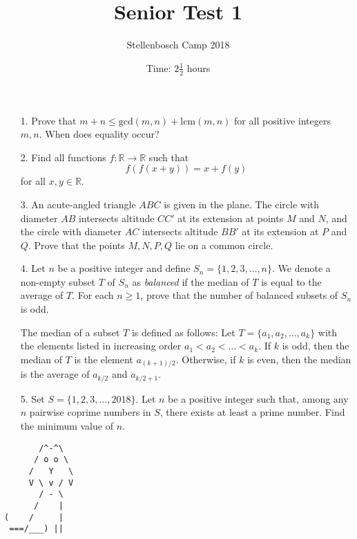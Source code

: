 \documentclass[a4paper, 12pt]{article}
\title{Senior Test 1}
\author{Stellenbosch Camp 2018}
\date{Time: $2 \frac{1}{2}$ hours}
\begin{document}
 \maketitle

\begin{enumerate}


\item[1.] Prove that $m + n \leq \textrm{gcd}(m, n) + \textrm{lcm}(m, n)$ for all positive integers $m, n$. When does equality occur?

\item[2.] Find all functions $f : \mathbb{R} \to \mathbb{R}$ such that
$$ f(f(x+y)) = x + f(y) $$
for all $x, y \in \mathbb{R}$.

\item[3.] An acute-angled triangle $ABC$ is given in the plane. The circle with diameter $AB$ intersects altitude $CC'$ at its extension at points $M$ and $N$, and the circle with diameter $AC$ intersects altitude $BB'$ at its extension at $P$ and $Q$. Prove that the points $M, N, P, Q$ lie on a common circle.


\item[4.] Let $n$ be a positive integer and define $S_n = \{1, 2, 3, \dots, n\}$. We denote a non-empty subset $T$ of $S_n$ as \textit{balanced} if the median of $T$ is equal to the average of $T$. For each $n \geq 1$, prove that the number of balanced subsets of $S_n$ is odd. 

The median of a subset $T$ is defined as follows: Let $T = \{a_1, a_2, \dots, a_k\}$ with the elements listed in increasing order $a_1 < a_2 < \dots < a_k$. If $k$ is odd, then the median of $T$ is the element $a_{(k+1)/2}$. Otherwise, if $k$ is even, then the median is the average of $a_{k/2}$ and $a_{k/2 + 1}$.

\item[5.] Set $S = \{1, 2, 3, ..., 2018\}$. Let $n$ be a positive integer such that, among any $n$ pairwise coprime numbers in $S$, there exists at least a prime number. Find the minimum value of $n$.


\end{enumerate}

\vfill

\centering
\begin{BVerbatim}
       /^-^\
      / o o \
     /   Y   \
     V \ v / V
       / - \
      /    |
(    /     |
 ===/___) ||
\end{BVerbatim}

\vspace{10mm}
\end{document}
